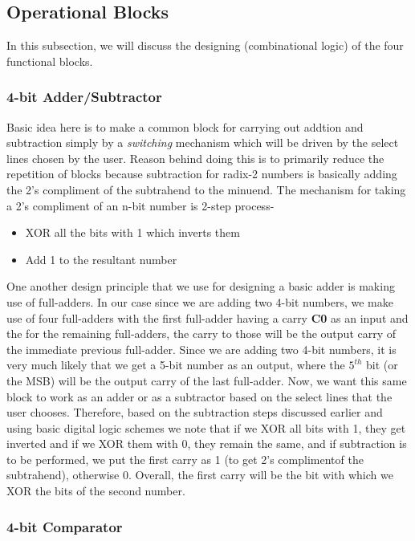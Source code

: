 \documentclass[a4paper, titlepage]{article}
\begin{document}
\subsection{Operational Blocks}
In this subsection, we will discuss the designing (combinational logic) of the four functional blocks.
\subsubsection{4-bit Adder/Subtractor}
Basic idea here is to make a common block for carrying out addtion and subtraction simply by a \textit{switching}
mechanism which will be driven by the select lines chosen by the user. Reason behind doing this is to primarily
reduce the repetition of blocks because subtraction for radix-2 numbers is basically adding the 2's compliment 
of the subtrahend to the minuend. \newline 
The mechanism for taking a 2's compliment of an n-bit number is 2-step process-
\begin{itemize}
    \item XOR all the bits with 1 which inverts them 
    \item Add 1 to the resultant number
\end{itemize}
One another design principle that we use for designing a basic adder is making use of full-adders. In our case 
since we are adding two 4-bit numbers, we make use of four full-adders with the first full-adder having a carry \textbf{C0}
as an input and the for the remaining full-adders, the carry to those will be the output carry of the immediate previous 
full-adder. Since we are adding two 4-bit numbers, it is very much likely that we get a 5-bit number as an output, where
the $5^{th}$ bit (or the MSB) will be the output carry of the last full-adder. \newline 
Now, we want this same block to work as an adder or as a subtractor based on the select lines that the user chooses. 
Therefore, based on the subtraction steps discussed earlier and using basic digital logic schemes
we note that if we XOR all bits with 1, they get inverted 
and if we XOR them with 0, they remain the same, and if subtraction is to be performed, we put the first carry as 1 (to get
2's complimentof the subtrahend), otherwise 0. Overall, the first carry will be the bit with which we XOR the bits of the
second number.
\subsubsection{4-bit Comparator}
\end{document}
